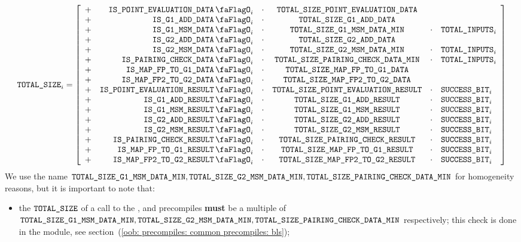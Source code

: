 \[
    \blsTotalSize _{i}
    =
    \left[ \begin{array}{crcccl}
        + & \isPointEvaluationData _{i} & \cdot & \totalSizePointEvaluationData \\
        + & \isBlsGOneAddData  _{i} & \cdot & \totalSizeBlsGOneAddData    \\
        + & \isBlsGOneMsmData  _{i} & \cdot & \totalSizeBlsGOneMsmDataMin & \cdot & \totalInputs      _{i} \\
        + & \isBlsGTwoAddData  _{i} & \cdot & \totalSizeBlsGTwoAddData    \\
        + & \isBlsGTwoMsmData  _{i} & \cdot & \totalSizeBlsGTwoMsmDataMin & \cdot & \totalInputs      _{i} \\
        + & \isBlsPairingCheckData _{i} & \cdot & \totalSizeBlsPairingCheckDataMin & \cdot & \totalInputs _{i} \\
        + & \isBlsMapFpToGOneData _{i} & \cdot & \totalSizeBlsMapFpToGOneData \\
        + & \isBlsMapFpTwoToGTwoData _{i} & \cdot & \totalSizeBlsMapFpTwoToGTwoData \\
        + & \isPointEvaluationResult _{i} & \cdot & \totalSizePointEvaluationResult & \cdot & \blsSuccessBit _{i} \\
        + & \isBlsGOneAddResult _{i} & \cdot & \totalSizeBlsGOneAddResult & \cdot & \blsSuccessBit _{i} \\
        + & \isBlsGOneMsmResult _{i} & \cdot & \totalSizeBlsGOneMsmResult & \cdot & \blsSuccessBit _{i} \\
        + & \isBlsGTwoAddResult _{i} & \cdot & \totalSizeBlsGTwoAddResult & \cdot & \blsSuccessBit _{i} \\
        + & \isBlsGTwoMsmResult _{i} & \cdot & \totalSizeBlsGTwoMsmResult & \cdot & \blsSuccessBit _{i} \\
        + & \isBlsPairingCheckResult _{i} & \cdot & \totalSizeBlsPairingCheckResult & \cdot & \blsSuccessBit _{i} \\
        + & \isBlsMapFpToGOneResult _{i} & \cdot & \totalSizeBlsMapFpToGOneResult & \cdot & \blsSuccessBit _{i} \\
        + & \isBlsMapFpTwoToGTwoResult _{i} & \cdot & \totalSizeBlsMapFpTwoToGTwoResult & \cdot & \blsSuccessBit _{i} \\
    \end{array} \right]
\]
\saNote{}
We use the name $\texttt{TOTAL\_SIZE\_G1\_MSM\_DATA\_MIN}, \texttt{TOTAL\_SIZE\_G2\_MSM\_DATA\_MIN}, \texttt{TOTAL\_SIZE\_PAIRING\_CHECK\_DATA\_MIN}$ for homogeneity reasons, but it is important to note that:
\begin{itemize}
    \item
        the $\texttt{TOTAL\_SIZE}$ of a call to the ,  and  precompiles \textbf{must} be a multiple of $\texttt{TOTAL\_SIZE\_G1\_MSM\_DATA\_MIN}, \texttt{TOTAL\_SIZE\_G2\_MSM\_DATA\_MIN}, \texttt{TOTAL\_SIZE\_PAIRING\_CHECK\_DATA\_MIN}$ respectively;
        this check is done in the \oobMod{} module, see
        section~(\ref{oob: precompiles: common precompiles: bls}); 
\end{itemize}
